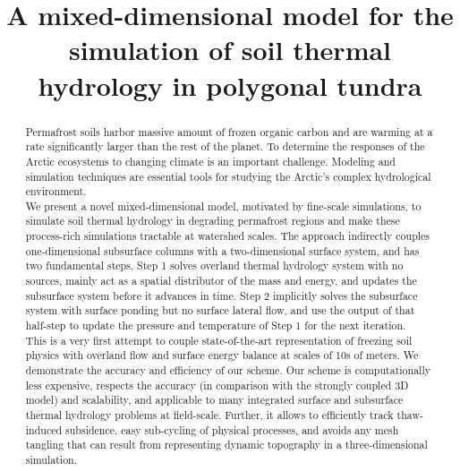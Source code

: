 \documentclass[review]{elsarticle}
\begin{document}
\begin{frontmatter}

\title{A mixed-dimensional model for the simulation of soil thermal hydrology in polygonal tundra}





\begin{abstract}
Permafrost soils harbor massive amount of frozen organic carbon and are warming at a rate significantly larger than the rest of the planet. To determine the responses of the Arctic ecosystems to changing climate is an important challenge. Modeling and simulation techniques are essential tools for studying the Arctic's complex hydrological environment.  \\
We present a novel mixed-dimensional model, motivated by fine-scale simulations, to simulate soil thermal hydrology in degrading permafrost regions and make these process-rich simulations tractable at watershed scales. The approach indirectly couples one-dimensional subsurface columns with a two-dimensional surface system, and has two fundamental steps. Step 1 solves overland thermal hydrology system with no sources, mainly act as a spatial distributor of the mass and energy, and updates the subsurface system before it advances in time. Step 2 implicitly solves the subsurface system with surface ponding but no surface lateral flow, and use the output of that half-step to update the pressure and temperature of Step 1 for the next iteration. \\
This is a very first attempt to couple state-of-the-art representation of freezing soil physics with overland flow and surface energy balance at scales of 10s of meters. 
We demonstrate the accuracy and efficiency of our scheme. Our scheme is computationally less expensive, respects the accuracy (in comparison with the strongly coupled 3D model) and scalability, and applicable to many integrated surface and subsurface thermal hydrology problems at field-scale. Further, it allows to efficiently track thaw-induced subsidence, easy sub-cycling of physical processes, and avoids any mesh tangling that can result from representing dynamic topography in a three-dimensional simulation. 
\end{abstract}


\end{frontmatter}
\end{document}
